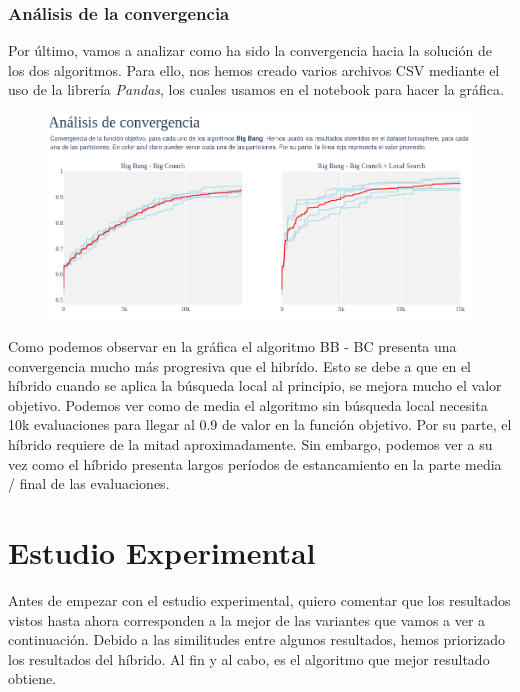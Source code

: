 \documentclass[10pt, a4paper]{article}
\theoremstyle{theorem-style}
\theoremstyle{theorem-style}
\theoremstyle{theorem2-style}
\theoremstyle{definition-style}
\theoremstyle{remark-style}
\theoremstyle{example-style}
\theoremstyle{definition-style}
\theoremstyle{remark-style}
\theoremstyle{remark-style}
\begin{document}
\subsubsection{Análisis de la convergencia}

Por último, vamos a analizar como ha sido la convergencia hacia la solución de los dos algoritmos. Para ello, nos hemos creado varios archivos CSV mediante el uso de la librería \textit{Pandas}, los cuales usamos en el notebook para hacer la gráfica. 

\begin{figure}[htp]
\centering
\includegraphics[scale=0.4750]{Imagenes/convergencia.png}
\label{}
\end{figure}

Como podemos observar en la gráfica el algoritmo BB - BC presenta una convergencia mucho más progresiva que el hibrído. Esto se debe a que en el híbrido cuando se aplica la búsqueda local al principio, se mejora mucho el valor objetivo. Podemos ver como de media el algoritmo sin búsqueda local necesita 10k evaluaciones para llegar al 0.9 de valor en la función objetivo. Por su parte, el híbrido requiere de la mitad aproximadamente. Sin embargo, podemos ver a su vez como el híbrido presenta largos períodos de estancamiento en la parte media / final de las evaluaciones. 

\newpage
\section{Estudio Experimental}

Antes de empezar con el estudio experimental, quiero comentar que los resultados vistos hasta ahora corresponden a la mejor de las variantes que vamos a ver a continuación. Debido a las similitudes entre algunos resultados, hemos priorizado los resultados del híbrido. Al fin y al cabo, es el algoritmo que mejor resultado obtiene. 
\end{document}
